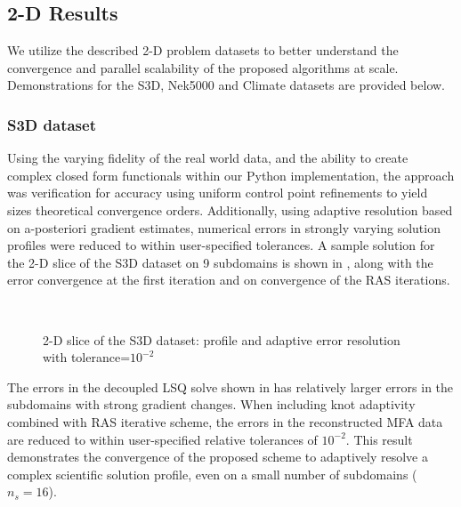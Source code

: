 \subsection{2-D Results}

We utilize the described 2-D problem datasets to better understand the convergence and parallel scalability of the proposed algorithms at scale. Demonstrations for the S3D, Nek5000 and Climate datasets are provided below.

\subsubsection{S3D dataset}
Using the varying fidelity of the real world data, and the ability to create complex closed form functionals within our Python implementation, the approach was verification for accuracy using uniform control point refinements to yield sizes theoretical convergence orders. Additionally, using adaptive resolution based on a-posteriori gradient estimates, numerical errors in strongly varying solution profiles were reduced to within user-specified tolerances. A sample solution for the 2-D slice of the S3D dataset on 9 subdomains is shown in , along with the error convergence at the first iteration and on convergence of the RAS iterations.

\begin{figure}
	\centering
	\hfill
	\\
	\caption{2-D slice of the S3D dataset: profile and adaptive error resolution with tolerance=$10^{-2}$}
	\label{fig:s3d-adaptive-2d}
\end{figure}

The errors in the decoupled LSQ solve shown in  has relatively larger errors in the subdomains with strong gradient changes. When including knot adaptivity combined with RAS iterative scheme, the errors in the reconstructed MFA data are reduced to within user-specified relative tolerances of $10^{-2}$. This result demonstrates the convergence of the proposed scheme to adaptively resolve a complex scientific solution profile, even on a small number of subdomains ($n_s=16$). 

